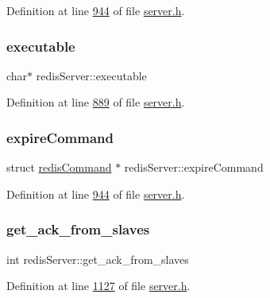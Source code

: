 Definition at line \hyperlink{server_8h_source_l00944}{944} of file \hyperlink{server_8h_source}{server.\+h}.

\mbox{\label{structredisServer_aacadd6634f36634de2be24d2d2232b62}} 
\subsubsection{\texorpdfstring{executable}{executable}}
{\footnotesize\ttfamily char$\ast$ redis\+Server\+::executable}



Definition at line \hyperlink{server_8h_source_l00889}{889} of file \hyperlink{server_8h_source}{server.\+h}.

\mbox{\label{structredisServer_adaf6417355ca78bdfd3f5064a85080f9}} 
\subsubsection{\texorpdfstring{expire\+Command}{expireCommand}}
{\footnotesize\ttfamily struct \hyperlink{structredisCommand}{redis\+Command} $\ast$ redis\+Server\+::expire\+Command}



Definition at line \hyperlink{server_8h_source_l00944}{944} of file \hyperlink{server_8h_source}{server.\+h}.

\mbox{\label{structredisServer_a7f2801c1f326dfcb2581ba6efad86b76}} 
\subsubsection{\texorpdfstring{get\+\_\+ack\+\_\+from\+\_\+slaves}{get\_ack\_from\_slaves}}
{\footnotesize\ttfamily int redis\+Server\+::get\+\_\+ack\+\_\+from\+\_\+slaves}



Definition at line \hyperlink{server_8h_source_l01127}{1127} of file \hyperlink{server_8h_source}{server.\+h}.

